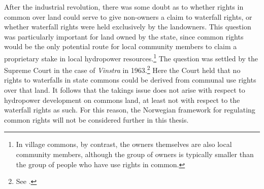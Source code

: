 After the industrial revolution, there was some doubt as to whether rights in common over land could serve to give non-owners a claim to waterfall rights, or whether waterfall rights were held exclusively by the landowners. This question was particularly important for land owned by the state, since common rights would be the only potential route for local community members to claim a proprietary stake in local hydropower resources.\footnote{In village commons, by contrast, the owners themselves are also local community members, although the group of owners is typically smaller than the group of people who have use rights in common.} The question was settled by the Supreme Court in the case of {\it Vinstra} in 1963.\footnote{See \cite{vinstra63}.} Here the Court held that no rights to waterfalls in state commons could be derived from communal use rights over that land. It follows that the takings issue does not arise with respect to hydropower development on commons land, at least not with respect to the waterfall rights as such. For this reason, the Norwegian framework for regulating common rights will not be considered further in this thesis.%

